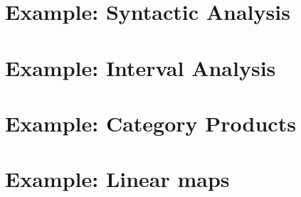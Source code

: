 \documentclass[10pt]{beamer}
\theoremstyle{definition}
\theoremstyle{remark}
\numberwithin{equation}{section}
\begin{document}
\begin{frame}[fragile]{}
\end{frame}

\begin{frame}[fragile]{}
\end{frame}

\begin{frame}[fragile]{}
\end{frame}

\begin{frame}[fragile]{}
\end{frame}

\begin{frame}[fragile]{}
\end{frame}

\begin{frame}[fragile]{}
\end{frame}

\begin{frame}[fragile]{}
\end{frame}

\section{Example: Syntactic Analysis} %

\section{Example: Interval Analysis} %

\section{Example: Category Products} %

\section{Example: Linear maps} %
\end{document}
